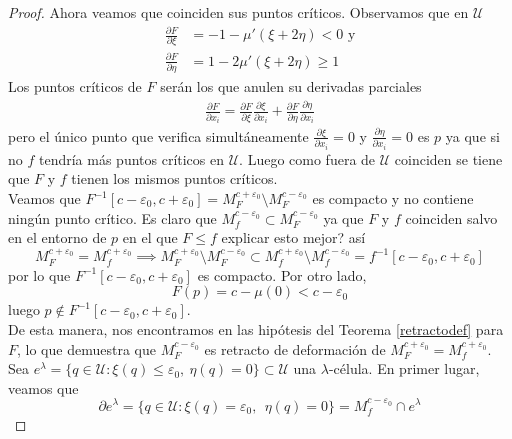 \begin{proof}
    Ahora veamos que coinciden sus puntos críticos. Observamos que en $\mathcal{U}$
    \begin{align*}
        \frac{\partial F}{\partial \xi}&=-1-\mu'(\xi + 2\eta)<0\text{ y}\\
        \frac{\partial F}{\partial \eta}&=1-2\mu'(\xi+2\eta)\ge 1
    \end{align*}
    Los puntos críticos de $F$ serán los que anulen su derivadas parciales
    \begin{align*}
        \frac{\partial F}{\partial x_i}=\frac{\partial F}{\partial \xi}\frac{\partial \xi}{\partial x_i} + \frac{\partial F}{\partial \eta}\frac{\partial \eta}{\partial x_i}
    \end{align*}
    pero el único punto que verifica simultáneamente $\frac{\partial \xi}{\partial x_i}=0$ y $\frac{\partial \eta}{\partial x_i}=0$ es $p$ ya que si no $f$ tendría más puntos críticos en $\mathcal{U}$. Luego como fuera de $\mathcal{U}$ coinciden se tiene que  $F$ y $f$ tienen los mismos puntos críticos.\\

    Veamos que $F^{-1}[c-\varepsilon_0,c+\varepsilon_0]=M^{c+\varepsilon_0}_F\setminus M^{c-\varepsilon_0}_F$ es compacto y no contiene ningún punto crítico. Es claro que $M^{c-\varepsilon_0}_f\subset M^{c-\varepsilon_0}_F$ ya que $F$ y $f$ coinciden salvo en el entorno de $p$ en el que $F\le f$ {\color{blue}explicar esto mejor?} así
    \begin{equation}
        M^{c+\varepsilon_0}_F=M^{c+\varepsilon_0}_f\implies M^{c+\varepsilon_0}_F\setminus M^{c-\varepsilon_0}_F \subset M^{c+\varepsilon_0}_f\setminus M^{c-\varepsilon_0}_f=f^{-1}[c-\varepsilon_0,c+\varepsilon_0]
    \end{equation}
    por lo que $F^{-1}[c-\varepsilon_0,c+\varepsilon_0]$ es compacto. Por otro lado,
    \begin{equation*}
        F(p)=c-\mu(0)<c-\varepsilon_0
    \end{equation*}
    luego $p\notin F^{-1}[c-\varepsilon_0,c+\varepsilon_0]$.\\

    De esta manera, nos encontramos en las hipótesis del Teorema \ref{retractodef} para $F$, lo que demuestra que $M^{c-\varepsilon_0}_F$ es retracto de deformación de $M^{c+\varepsilon_0}_F=M^{c+\varepsilon_0}_f$.\\


    Sea $e^{\lambda}=\{q\in \mathcal{U}: \xi(q)\le \varepsilon_0,~\eta(q)=0 \}\subset \mathcal{U}$ una $\lambda$-célula. En primer lugar, veamos que
    \begin{equation*}
        \partial e^{\lambda}=\{q\in \mathcal{U}: \xi(q)= \varepsilon_0,~~\eta(q)=0 \}=M^{c-\varepsilon_0}_f\cap e^{\lambda}
    \end{equation*}
    

\end{proof}
